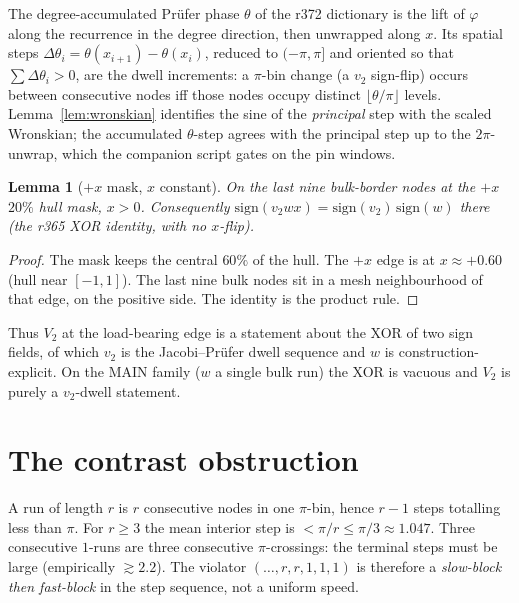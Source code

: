 \documentclass[11pt]{article}
\newtheorem{lemma}{Lemma}
\theoremstyle{remark}
\begin{document}
The degree-accumulated Pr\"ufer phase $\theta$ of the r372
dictionary is the lift of $\varphi$ along the recurrence in the
degree direction, then unwrapped along $x$.  Its spatial steps
$\Delta\theta_i=\theta(x_{i+1})-\theta(x_i)$, reduced to
$(-\pi,\pi]$ and oriented so that $\sum\Delta\theta_i>0$, are
the dwell increments: a $\pi$-bin change (a $v_2$ sign-flip)
occurs between consecutive nodes iff those nodes occupy
distinct $\lfloor\theta/\pi\rfloor$ levels.  Lemma~\ref{lem:wronskian}
identifies the sine of the \emph{principal} step with the
scaled Wronskian; the accumulated $\theta$-step agrees with the
principal step up to the $2\pi$-unwrap, which the companion
script gates on the pin windows.

\begin{lemma}[$+x$ mask, $x$ constant]\label{lem:xconst}
On the last nine bulk-border nodes at the $+x$ $20\%$ hull mask,
$x>0$.  Consequently
$\mathrm{sign}(v_2 w x)=\mathrm{sign}(v_2)\,\mathrm{sign}(w)$
there (the r365 XOR identity, with no $x$-flip).
\end{lemma}

\begin{proof}
The mask keeps the central $60\%$ of the hull.  The $+x$ edge
is at $x\approx +0.60$ (hull near $[-1,1]$).  The last nine
bulk nodes sit in a mesh neighbourhood of that edge, on the
positive side.  The identity is the product rule.
\end{proof}

Thus $V_2$ at the load-bearing edge is a statement about the
XOR of two sign fields, of which $v_2$ is the Jacobi--Pr\"ufer
dwell sequence and $w$ is construction-explicit.  On the MAIN
family ($w$ a single bulk run) the XOR is vacuous and $V_2$ is
purely a $v_2$-dwell statement.

\section{The contrast obstruction}\label{sec:contrast}

A run of length $r$ is $r$ consecutive nodes in one $\pi$-bin,
hence $r-1$ steps totalling less than $\pi$.  For $r\ge 3$ the
mean interior step is $<\pi/r\le\pi/3\approx 1.047$.  Three
consecutive $1$-runs are three consecutive $\pi$-crossings: the
terminal steps must be large (empirically $\gtrsim 2.2$).  The
violator $(\ldots,r,r,1,1,1)$ is therefore a
\emph{slow-block then fast-block} in the step sequence, not a
uniform speed.
\end{document}
